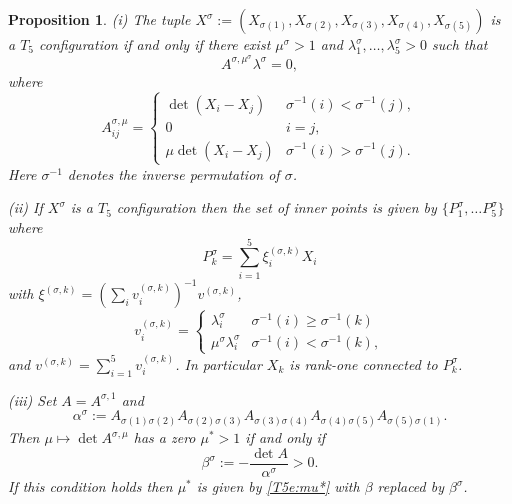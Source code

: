 \documentclass[titlepage]{amsart}
\numberwithin{equation}{section}
\theoremstyle{plain}
\newtheorem{proposition}[equation]{Proposition}
\theoremstyle{definition}
\theoremstyle{remark}
\begin{document}
\begin{proposition}   \label{pr:T5_permutation} 
(i) The tuple
$X^\sigma := \left(X_{\sigma(1)},X_{\sigma(2)},X_{\sigma(3)},X_{\sigma(4)},X_{\sigma(5)}\right)$ is a $T_5$ configuration if and only if 
there exist $\mu^{\sigma}>1$ and $\lambda_1^{\sigma},\dots,\lambda_5^{\sigma}>0$ such that
$$
A^{\sigma,\mu^{\sigma}}\lambda^{\sigma}=0,
$$
where
$$
A_{ij}^{\sigma,\mu}=\begin{cases}\det(X_i-X_j)&\sigma^{-1}(i)<\sigma^{-1}(j),\\ 
0&i=j,\\
\mu\det(X_i-X_j)&\sigma^{-1}(i)>\sigma^{-1}(j).\end{cases} 
$$
Here  $\sigma^{-1}$ denotes  the inverse permutation of $\sigma$. 

(ii) If $X^\sigma$ is a $T_5$ configuration then the set of inner points is given by
$\{ P^\sigma_1, \ldots P^\sigma_5\}$ where   
\begin{equation} \label{T5e:Pki}
P_k^\sigma = \sum_{i=1}^5  \xi^{(\sigma, k)}_i X_i
\end{equation}
with  $\xi^{(\sigma, k)} = (\sum_{i} v_i^{(\sigma,k)})^{-1} v^{(\sigma,k)}$, 
\begin{equation}\label{T5e:vki} 
v^{(\sigma,k)}_i = \begin{cases}\lambda^\sigma_i & \sigma^{-1}(i)\geq \sigma^{-1}(k)\\ \mu^\sigma\lambda^\sigma_i & \sigma^{-1}(i)< \sigma^{-1}(k), \end{cases}
\end{equation}
and $v^{(\sigma, k)} = \sum_{i=1}^5 v^{(\sigma, k)}_i$.
In particular $X_k$ is rank-one connected to $P^\sigma_k$. 

(iii) Set $A = A^{\sigma,1}$ and 
\begin{equation}\label{e:permuteddeterminants}
\alpha^\sigma := A_{\sigma(1) \sigma(2)}  A_{\sigma(2) \sigma(3)} A_{\sigma(3) \sigma(4)} A_{\sigma(4) \sigma(5)}  A_{\sigma(5) \sigma(1)}.
\end{equation}
Then $ \mu \mapsto \det A^{\sigma, \mu}$  has a zero  $\mu^* > 1$ if and only if
$$ \beta^\sigma := -  \frac{\det A}{\alpha^\sigma} > 0.$$
If this condition holds then $\mu^*$ is given by  \eqref{T5e:mu*} with $\beta$ replaced by $\beta^\sigma$.
\end{proposition}
\end{document}
